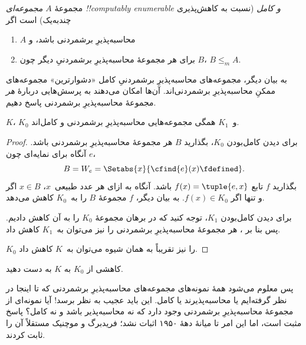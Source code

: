 \documentclass[../../../include/open-logic-section]{subfiles}
\begin{document}

\begin{defn}
مجموعهٔ $A$ \emph{مجموعه‌ای !!{computably enumerable} و کامل}
(نسبت به کاهش‌پذیری چندبه‌یک) است اگر
\begin{enumerate}
\item $A$ محاسبه‌پذیرِ برشمردنی باشد، و
\item برای هر مجموعهٔ محاسبه‌پذیرِ برشمردنیِ دیگر چون $B$،
  $B\leq_m A$.
\end{enumerate}
\end{defn}

به بیان دیگر، مجموعه‌های محاسبه‌پذیرِ برشمردنیِ کامل «دشوارترین»
مجموعه‌های ممکنِ محاسبه‌پذیرِ برشمردنی‌اند. آن‌ها امکان می‌دهند به
پرسش‌هایی دربارهٔ \emph{هر} مجموعهٔ محاسبه‌پذیرِ برشمردنی پاسخ دهیم.

\begin{thm}
$K$، $K_0$ و~$K_1$ همگی مجموعه‌هایی محاسبه‌پذیرِ برشمردنی و کامل‌اند.
\end{thm}

\begin{proof}
برای دیدن کامل‌بودن $K_0$، بگذارید $B$ هر مجموعهٔ محاسبه‌پذیرِ
برشمردنی باشد. آنگاه برای نمایه‌ای چون $e$،
\[
B = W_e = \Setabs{x}{\cfind{e}(x) \fdefined}.
\]
بگذارید $f$ تابع $f(x)=\tuple{e,x}$ باشد. آنگاه به ازای هر عدد
طبیعی~$x$، $x\in B$ اگر و تنها اگر $f(x)\in K_0$. به بیان دیگر، $f$
مجموعهٔ $B$ را به~$K_0$ کاهش می‌دهد.

برای دیدن کامل‌بودن $K_1$، توجه کنید که در برهان
 مجموعهٔ $K_0$ را به آن کاهش دادیم. پس بنا بر
، هر مجموعهٔ محاسبه‌پذیرِ برشمردنی را نیز
می‌توان به~$K_1$ کاهش داد.

$K_0$ را نیز تقریباً به همان شیوه می‌توان به~$K$ کاهش داد.
\end{proof}

\begin{prob}
کاهشی از $K_0$ به $K$ به دست دهید.
\end{prob}

\begin{digress}
پس معلوم می‌شود همهٔ نمونه‌های مجموعه‌های محاسبه‌پذیرِ برشمردنی که تا
اینجا در نظر گرفته‌ایم یا محاسبه‌پذیرند یا کامل. این باید عجیب به نظر
برسد!{} آیا نمونه‌ای از مجموعهٔ محاسبه‌پذیرِ برشمردنی وجود دارد که نه
محاسبه‌پذیر باشد و نه کامل؟ پاسخ مثبت است، اما این امر تا میانهٔ
دههٔ ۱۹۵۰ اثبات نشد؛ فریدبرگ و موچنیک مستقلاً آن را ثابت کردند.
\end{digress}
\end{document}
